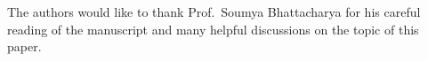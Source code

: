\documentclass[sn-mathphys]{sn-jnl}%
\theoremstyle{thmstyleone}%
\theoremstyle{thmstyletwo}%
\theoremstyle{thmstylethree}%
\begin{document}


\backmatter



The authors would like to thank Prof.\ Soumya Bhattacharya for his careful reading of the manuscript and many helpful discussions on the topic of this paper.


\end{document}
